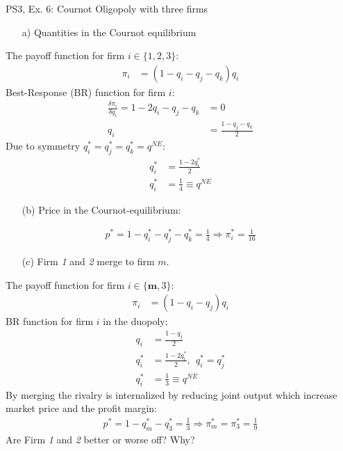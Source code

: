 \begin{frame}{PS3, Ex. 6: Cournot Oligopoly with three firms}
  \begin{multicols}{2}
    \begin{itemize}
      \item[a)] Quantities in the Cournot equilibrium
    \end{itemize}
    The payoff function for firm $i\in\{1,2,3\}$:
    \begin{align*}
        \pi_i&=(1-q_i-q_j-q_k)q_i
    \end{align*}
    Best-Response (BR) function for firm $i$:
    \begin{align*}
        \frac{\delta\pi_i}{\delta q_i}=1-2q_i-q_j-q_k&=0\\
                                                  q_i&=\frac{1-q_j-q_k}{2}
    \end{align*}
    Due to symmetry $q_i^{*}=q_j^{*}=q_k^{*}=q^{NE}$:
    \begin{align*}
        q_i^{*} &= \frac{1-2q_i^{*}}{2}\\
        q_i^{*} &= \frac{1}{4}\equiv q^{NE}
    \end{align*}
    \begin{itemize}
      \item[(b)] Price in the Cournot-equilibrium:
    \end{itemize}
    \begin{align*}
      p^{*}=1-q_i^{*}-q_j^{*}-q_k^{*}=\frac{1}{4}\Rightarrow\pi_i^{*}=\frac{1}{16}
    \end{align*}
  \vfill\null \columnbreak
    \begin{itemize}
      \item[(c)] Firm \textit{1} and \textit{2} merge to firm $m$.
    \end{itemize}
    The payoff function for firm $i\in\{\bm{m},3\}$:
    \begin{align*}
        \pi_i&=(1-q_i-q_j)q_i
    \end{align*}
    BR function for firm $i$ in the duopoly:
    \begin{align*}
        q_i&=\frac{1-q_j}{2}\\
        q_i^{*} &= \frac{1-2q_i^{*}}{2},\ \ q_i^{*}=q_j^{*}\\
        q_i^{*} &= \frac{1}{3}\equiv q^{NE}
    \end{align*}
    By merging the rivalry is internalized by reducing joint output which increase market price and the profit margin:
    \begin{align*}
      p^{*}=1-q_m^{*}-q_3^{*}=\frac{1}{3}\Rightarrow\pi_m^{*}=\pi_3^{*}=\frac{1}{9}
    \end{align*}
    Are Firm \textit{1} and \textit{2} better or worse off? Why?
  \vfill\null
  \end{multicols}
\end{frame}
